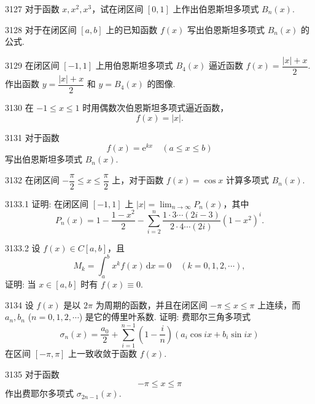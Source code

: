 \begin{prob}[M]{3127}
对于函数 $x, x^2, x^3$，试在闭区间 $[0, 1]$ 上作出伯恩斯坦多项式 $B_n(x)$.
\end{prob}

\begin{prob}[M]{3128}
对于在闭区间 $[a, b]$ 上的已知函数 $f(x)$ 写出伯恩斯坦多项式 $B_n(x)$ 的公式.
\end{prob}

\begin{prob}[M]{3129}
在闭区间 $[-1, 1]$ 上用伯恩斯坦多项式 $B_4(x)$ 逼近函数 $f(x) = \dfrac{|x| + x}{2}$. 作出函数 $y = \dfrac{|x| + x}{2}$ 和 $y = B_4(x)$ 的图像.
\end{prob}

\begin{prob}[M]{3130}
在 $-1 \leqslant x \leqslant 1$ 时用偶数次伯恩斯坦多项式逼近函数，
\[
f(x) = |x|.
\]
\end{prob}

\begin{prob}[M]{3131}
对于函数
\[
f(x) = \mathrm{e}^{kx} \quad (a \leqslant x \leqslant b)
\]
写出伯恩斯坦多项式 $B_n(x)$.
\end{prob}

\begin{prob}[M]{3132}
在闭区间 $-\dfrac{\pi}{2} \leqslant x \leqslant \dfrac{\pi}{2}$ 上，对于函数 $f(x) = \cos x$ 计算多项式 $B_n(x)$.
\end{prob}

\begin{prob}[M]{3133.1}
证明: 在闭区间 $[-1, 1]$ 上 $|x| = \lim_{n \to \infty} P_n(x)$，其中
\[
P_n(x) = 1 - \frac{1 - x^2}{2} - \sum_{i=2}^{n} \frac{1 \cdot 3 \cdots (2i - 3)}{2 \cdot 4 \cdots (2i)} (1 - x^2)^i.
\]
\end{prob}

\begin{prob}[M]{3133.2}
设 $f(x) \in C[a, b]$，且
\[
M_k = \int_{a}^{b} x^k f(x) \,\mathrm{d}x = 0 \quad (k = 0, 1, 2, \cdots),
\]
证明: 当 $x \in [a, b]$ 时有 $f(x) \equiv 0$.
\end{prob}

\begin{prob}[L]{3134}
设 $f(x)$ 是以 $2\pi$ 为周期的函数，并且在闭区间 $-\pi \leqslant x \leqslant \pi$ 上连续，而 $a_n, b_n$ ($n = 0, 1, 2, \cdots$) 是它的傅里叶系数. 证明: 费耶尔三角多项式
\[
\sigma_n(x) = \frac{a_0}{2} + \sum_{i=1}^{n-1} \left(1 - \frac{i}{n}\right) (a_i \cos ix + b_i \sin ix)
\]
在区间 $[-\pi, \pi]$ 上一致收敛于函数 $f(x)$.
\end{prob}

\begin{prob}[S]{3135}
对于函数
\[
-\pi \leqslant x \leqslant \pi
\]
作出费耶尔多项式 $\sigma_{2n-1}(x)$.
\end{prob}
